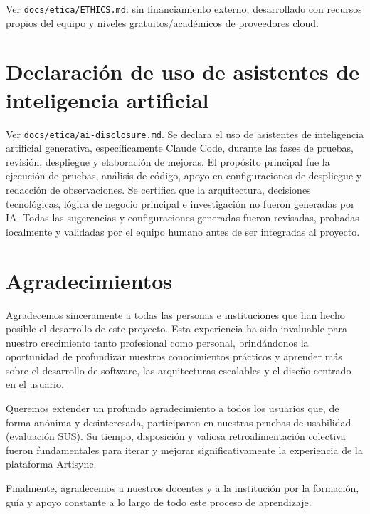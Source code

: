 Ver \texttt{docs/etica/ETHICS.md}: sin financiamiento externo;
desarrollado con recursos propios del equipo y niveles gratuitos/académicos
de proveedores cloud.

\section{Declaración de uso de asistentes de inteligencia artificial}

Ver \texttt{docs/etica/ai-disclosure.md}. Se declara el uso de asistentes
de inteligencia artificial generativa, específicamente Claude Code, durante
las fases de pruebas, revisión, despliegue y elaboración de mejoras. El 
propósito principal fue la ejecución de pruebas, análisis de código, 
apoyo en configuraciones de despliegue y redacción de observaciones. 
Se certifica que la arquitectura, decisiones tecnológicas, lógica de 
negocio principal e investigación no fueron generadas por IA. Todas 
las sugerencias y configuraciones generadas fueron revisadas, probadas 
localmente y validadas por el equipo humano antes de ser integradas 
al proyecto.

\section{Agradecimientos}

Agradecemos sinceramente a todas las personas e instituciones que han hecho
posible el desarrollo de este proyecto. Esta experiencia ha sido invaluable para
nuestro crecimiento tanto profesional como personal, brindándonos la oportunidad
de profundizar nuestros conocimientos prácticos y aprender más sobre el
desarrollo de software, las arquitecturas escalables y el diseño centrado en el
usuario.

Queremos extender un profundo agradecimiento a todos los usuarios que, de forma
anónima y desinteresada, participaron en nuestras pruebas de usabilidad
(evaluación SUS). Su tiempo, disposición y valiosa retroalimentación colectiva
fueron fundamentales para iterar y mejorar significativamente la experiencia de
la plataforma Artisync.

Finalmente, agradecemos a nuestros docentes y a la institución por la formación,
guía y apoyo constante a lo largo de todo este proceso de aprendizaje.
